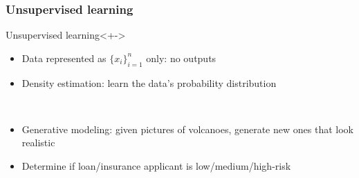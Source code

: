 \begin{frame}
    \frametitle{Unsupervised learning}
    \begin{block}{Unsupervised learning}<+->
        \begin{itemize}
            \item Data represented as $\{x_i\}_{i=1}^n$ only: no outputs
            \item \alert{Density estimation}: learn the data's probability distribution
        \end{itemize}
    \end{block}

     \\[1ex]

    \begin{itemize}[<.->]
        \item Generative modeling: given pictures of volcanoes, generate new ones that look realistic
        \item Determine if loan/insurance applicant is low/medium/high-risk
    \end{itemize}

\end{frame}


